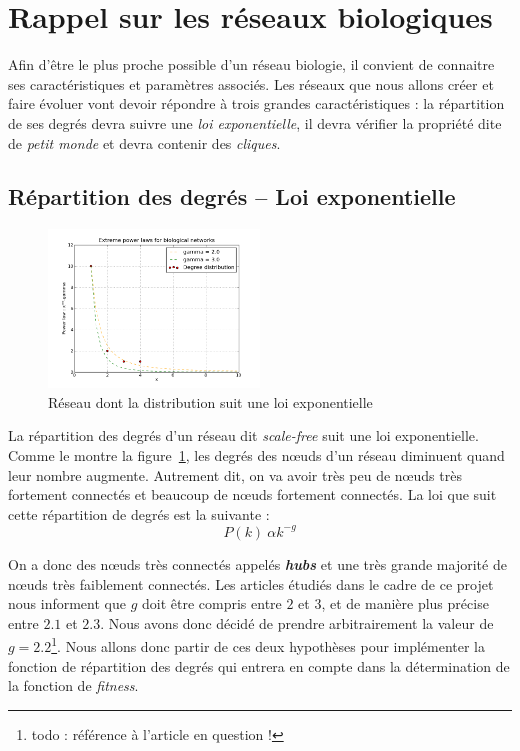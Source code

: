 \section{Rappel sur les réseaux biologiques}
Afin d'être le plus proche possible d'un réseau biologie, il convient de connaitre ses caractéristiques et paramètres associés. Les réseaux que nous allons créer et faire évoluer vont devoir répondre à trois grandes caractéristiques : la répartition de ses degrés devra suivre une \textit{loi exponentielle}, il devra vérifier la propriété dite de \textit{\og petit monde \fg} et devra contenir des \textit{cliques}.

\subsection{Répartition des degrés -- Loi exponentielle}
\begin{figure}
  \vspace{-30pt}
  \begin{center}
    \includegraphics[width=0.50\textwidth]{Plot.png}
  \end{center}
  \caption{Réseau dont la distribution suit une loi exponentielle}
  \label{scalefree}
\end{figure}
La répartition des degrés d'un réseau dit \textit{scale-free} suit une loi exponentielle. Comme le montre la figure~\ref{scalefree}, les degrés des nœuds d'un réseau diminuent quand leur nombre augmente. Autrement dit, on va avoir très peu de nœuds très fortement connectés et beaucoup de nœuds fortement connectés. La loi que suit cette répartition de degrés est la suivante :
$$ P(k) ~ \alpha k^{-g} $$

On a donc des nœuds très connectés appelés \textit{\textbf{hubs}} et une très grande majorité de nœuds très faiblement connectés.	Les articles étudiés dans le cadre de ce projet nous informent que $g$ doit être compris entre $2$ et $3$, et de manière plus précise entre $2.1$ et $2.3$. Nous avons donc décidé de prendre arbitrairement la valeur de $g=2.2$\footnote{todo : référence à l'article en question !}. Nous allons donc partir de ces deux hypothèses pour implémenter la fonction de répartition des degrés qui entrera en compte dans la détermination de la fonction de \textit{fitness}.

